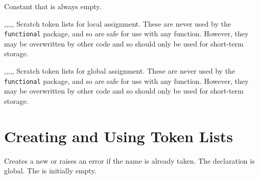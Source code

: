 \documentclass[oneside]{book}
\begin{document}
\begin{variable}{\cEmptyTl}
Constant that is always empty.
\end{variable}


\begin{variable}{\lTmpaTl,\lTmpbTl,\lTmpcTl,\lTmpiTl,\lTmpjTl,\lTmpkTl}
Scratch token lists for local assignment. These are never used by
the \verb!functional! package, and so are safe for use with any
function. However, they may be overwritten by other
code and so should only be used for short-term storage.
\end{variable}

\begin{variable}{\gTmpaTl,\gTmpbTl,\gTmpcTl,\gTmpiTl,\gTmpjTl,\gTmpkTl}
Scratch token lists for global assignment. These are never used by
the \verb!functional! package, and so are safe for use with any
function. However, they may be overwritten by other
code and so should only be used for short-term storage.
\end{variable}

\section{Creating and Using Token Lists}

\begin{function}{\tlNew}
\begin{syntax}
 
\end{syntax}
Creates a new  or raises an error if the
name is already taken. The declaration is global. The
 is initially empty.
\begin{codehigh}
\tlNew \lFooSomeTl
\end{codehigh}
\end{function}
\end{document}
